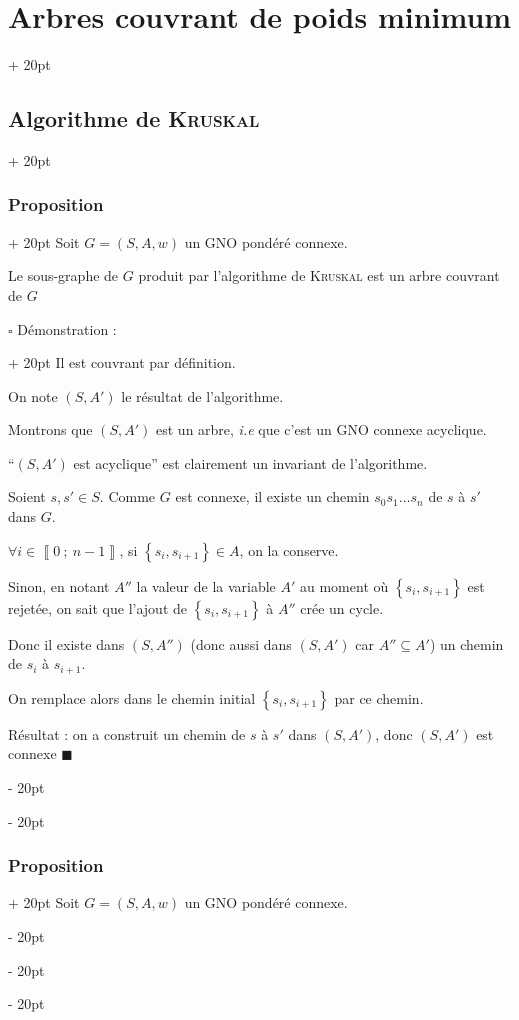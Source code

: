 \documentclass[a4paper, 12pt, twoside]{article}
\newcommand{\nset}[2]{\left\llbracket #1\ ;\ #2 \right\rrbracket}
\newcommand{\set}[1]{\left\{ #1 \right\}}
\newcommand{\ind}[1][20pt]{\advance\leftskip + #1}
\newcommand{\deind}[1][20pt]{\advance\leftskip - #1}
\newenvironment{indt}[2][20pt]{#2 \par \ind[#1]}{\par \deind} %
\newenvironment{proof}[1][{Démonstration :}]{\begin{indt}{$\square$ #1}}{$\blacksquare$ \end{indt}}
\begin{document}
\begin{indt}{\section{Arbres couvrant de poids minimum}}
\begin{indt}{\subsection{Algorithme de \textsc{Kruskal}}}
\begin{indt}{\subsubsection{Proposition}}
                Soit $G = (S, A, w)$ un GNO pondéré connexe.

                Le sous-graphe de $G$ produit par l'algorithme de \textsc{Kruskal} est un arbre couvrant de $G$

                \vspace{12pt}
                
                \begin{proof}
                    Il est couvrant par définition.

                    On note $(S, A')$ le résultat de l'algorithme.

                    Montrons que $(S, A')$ est un arbre, \textit{i.e} que c'est un GNO connexe acyclique.

                    ``$(S, A')$ est acyclique'' est clairement un invariant de l'algorithme.

                    Soient $s, s' \in S$. Comme $G$ est connexe, il existe un chemin $s_0 s_1 \ldots s_n$ de $s$ à $s'$ dans $G$.

                    $\forall i \in \nset 0 {n - 1}$, si $\set{s_i, s_{i + 1}} \in A$, on la conserve.

                    Sinon, en notant $A''$ la valeur de la variable $A'$ au moment où $\set{s_i, s_{i + 1}}$ est rejetée, on sait que l'ajout de $\set{s_i, s_{i + 1}}$ à $A''$ crée un cycle.

                    Donc il existe dans $(S, A'')$ (donc aussi dans $(S, A')$ car $A'' \subseteq A'$) un chemin de $s_i$ à $s_{i + 1}$.

                    On remplace alors dans le chemin initial $\set{s_i, s_{i + 1}}$ par ce chemin.

                    \vspace{6pt}
                    
                    Résultat : on a construit un chemin de $s$ à $s'$ dans $(S, A')$, donc $(S, A')$ est connexe
                \end{proof}
            \end{indt}

            \vspace{12pt}
            
            \begin{indt}{\subsubsection{Proposition}}
                Soit $G = (S, A, w)$ un GNO pondéré connexe.


\end{indt}
\end{indt}
\end{indt}
\end{document}
